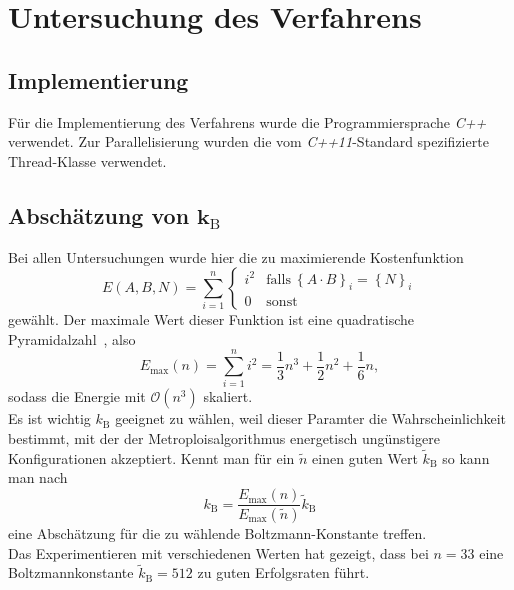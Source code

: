 \chapter{Untersuchung des Verfahrens}

\section{Implementierung}
Für die Implementierung des Verfahrens wurde die Programmiersprache \textit{C++} verwendet. Zur Parallelisierung wurden die vom \textit{C++11}-Standard spezifizierte Thread-Klasse verwendet.

\section{\texorpdfstring{Abschätzung von $\bm{k_\mathrm{B}}$}{Abschätzung von kB}}
Bei allen Untersuchungen wurde hier die zu maximierende Kostenfunktion
\begin{equation*}
		E\left(A,B,N\right)=\sum\limits_{i=1}^n\begin{cases}
    i^2 & \mathrm{falls}\:{\left\{A\cdot B\right\}}_i={\left\{N\right\}}_i \\
	0 & \mathrm{sonst}
  \end{cases}
\end{equation*}
gewählt. Der maximale Wert dieser Funktion ist eine quadratische Pyramidalzahl~\parencite{oeis}, also
\begin{equation*}
		E_{\mathrm{max}}\left(n\right)=\sum\limits_{i=1}^n i^2=\frac{1}{3}n^3+\frac{1}{2}n^2+\frac{1}{6}n,
\end{equation*}
sodass die Energie mit $\mathcal{O}\left(n^3\right)$ skaliert. \\
Es ist wichtig $k_\mathrm{B}$ geeignet zu wählen, weil dieser Paramter die Wahrscheinlichkeit bestimmt, mit der der Metroploisalgorithmus energetisch ungünstigere Konfigurationen akzeptiert. Kennt man für ein $\tilde{n}$ einen guten Wert $\tilde{k}_\mathrm{B}$ so kann man nach
\begin{equation*}
		k_\mathrm{B}=\frac{E_{\mathrm{max}}\left(n\right)}{E_{\mathrm{max}}\left(\tilde{n}\right)}\tilde{k}_\mathrm{B}
\end{equation*}
eine Abschätzung für die zu wählende Boltzmann-Konstante treffen. \\
Das Experimentieren mit verschiedenen Werten hat gezeigt, dass bei $n=33$ eine Boltzmannkonstante $\tilde{k}_\mathrm{B}=512$ zu guten Erfolgsraten führt.

